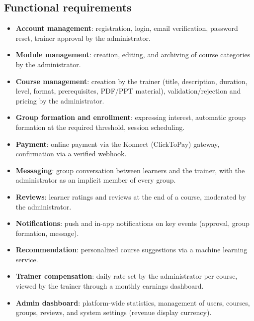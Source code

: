 \documentclass[a4paper,12pt]{report}
\begin{document}
\subsection{Functional requirements}
\begin{itemize}[leftmargin=*]
  \item \textbf{Account management}: registration, login, email
        verification, password reset, trainer approval by the
        administrator.
  \item \textbf{Module management}: creation, editing, and archiving of
        course categories by the administrator.
  \item \textbf{Course management}: creation by the trainer (title,
        description, duration, level, format, prerequisites, PDF/PPT
        material), validation/rejection and pricing by the administrator.
  \item \textbf{Group formation and enrollment}: expressing interest,
        automatic group formation at the required threshold, session
        scheduling.
  \item \textbf{Payment}: online payment via the Konnect (ClickToPay)
        gateway, confirmation via a verified webhook.
  \item \textbf{Messaging}: group conversation between learners and the
        trainer, with the administrator as an implicit member of every
        group.
  \item \textbf{Reviews}: learner ratings and reviews at the end of a
        course, moderated by the administrator.
  \item \textbf{Notifications}: push and in-app notifications on key
        events (approval, group formation, message).
  \item \textbf{Recommendation}: personalized course suggestions via a
        machine learning service.
  \item \textbf{Trainer compensation}: daily rate set by the administrator
        per course, viewed by the trainer through a monthly earnings
        dashboard.
  \item \textbf{Admin dashboard}: platform-wide statistics, management of
        users, courses, groups, reviews, and system settings (revenue
        display currency).
\end{itemize}
\end{document}
